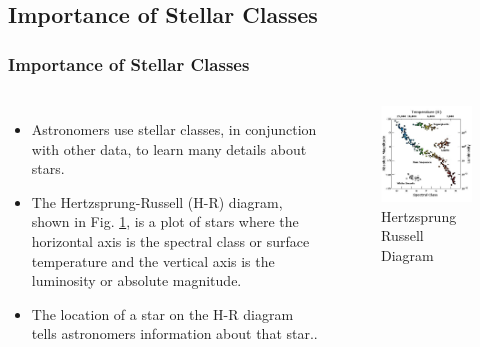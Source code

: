 \documentclass[aspectratio=169]{beamer}
\begin{document}
\subsection{Importance of Stellar Classes}
\begin{frame}
\frametitle{Importance of Stellar Classes}
  \begin{block}

    \begin{columns}[t]
\vspace{-0.5cm}
	\begin{itemize}
	\item Astronomers use stellar classes, in conjunction with other data, to learn many details about stars. 
\item The Hertzsprung-Russell (H-R) diagram, shown in Fig. \ref{fig:HR}, is a plot of stars where the horizontal axis is the spectral class or surface temperature and the vertical axis is the luminosity or absolute magnitude.
	\item The location of a star on the H-R diagram tells astronomers information about that star.\cite{Carroll}.
	\end{itemize}
        \begin{figure}
	\vspace{-1cm} 
            \centering
            \includegraphics[scale = .37]{HR.jpg} %
            \caption{Hertzsprung Russell Diagram \cite{hr}}
            \label{fig:HR}
        \end{figure}

    \end{columns}
  \end{block}

\end{frame}
\end{document}
